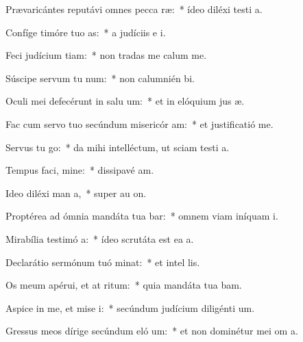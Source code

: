 \item Prævaricántes reputávi omnes pecca ræ:~* ídeo diléxi testi a.
\item Confíge timóre tuo  as:~* a judíciis e  i.
\item Feci judícium  tiam:~* non tradas me calum me.
\item Súscipe servum tu  num:~* non calumnién  bi.
\item Oculi mei defecérunt in salu um:~* et in elóquium jus æ.
\item Fac cum servo tuo secúndum misericór am:~* et justificatió   me.
\item Servus tu  go:~* da mihi intelléctum, ut sciam testi a.
\item Tempus faci, mine:~* dissipavé  am.
\item Ideo diléxi man a,~* super au  on.
\item Proptérea ad ómnia mandáta tua bar:~* omnem viam iníquam  i.
\item Mirabília testimó a:~* ídeo scrutáta est ea  a.
\item Declarátio sermónum tuó minat:~* et intel  lis.
\item Os meum apérui, et at ritum:~* quia mandáta tua bam.
\item Aspice in me, et mise i:~* secúndum judícium diligénti  um.
\item Gressus meos dírige secúndum eló um:~* et non dominétur mei om a.
